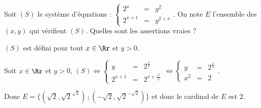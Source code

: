 \begin{question} 

Soit $(S)$ le système d'équations : $\left\{\begin{array}{ccl}2^x&=&y^2\\2^{x+1}&=&y^{2+x} \end{array}\right.$.  On note $E$ l'ensemble des $(x,y)$ qui vérifient $(S)$. Quelles sont les assertions vraies ?

\begin{answers}


    
\end{answers}
\begin{explanations}
$(S)$ est défini pour tout $x\in \Rr$ et $y>0$.

Soit $x\in \Rr$ et $y>0$, $(S) \Leftrightarrow \left\{\begin{array}{ccl}y&=&2^{\frac{x}{2}} \\2^{x+1}&=&2^{x+\frac{x^2}{2}} \end{array}\right.  \Leftrightarrow \left\{\begin{array}{ccl}y&=&2^{\frac{x}{2}} \\x^2&=&2 \end{array}\right. $. 

Donc $E = \{ (\sqrt 2, \sqrt 2^{\sqrt 2})\,  ; (-\sqrt 2, \sqrt 2^{-\sqrt 2})\}$ et donc le cardinal de $E$ est $2$.
\end{explanations}

\end{question}




